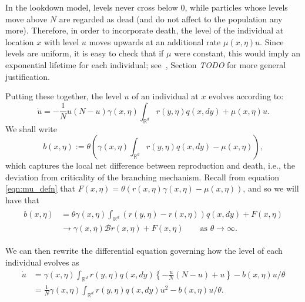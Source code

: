 \documentclass[12pt]{article}
\newcommand{\IR}{\mathbb R}
\newcommand{\DG}{\mathcal{B}}  %
\newcommand{\comment}[1]{{\color{blue} \it #1}}
\begin{document}
In the lookdown model, levels never cross below 0,
while particles whose levels move above $N$ are regarded as dead
(and do not affect to the population any more).
Therefore, in order to incorporate death,
the level of the individual at location $x$ with level $u$
moves upwards at an additional rate $\mu(x,\eta) u$.
Since levels are uniform,
it is easy to check that if $\mu$ were constant,
this would imply an exponential lifetime for each individual;
see~\cite{etheridge/kurtz:2018}, Section \comment{TODO}
for more general justification.

Putting these together,
the level $u$ of an individual at $x$ evolves according to:
\begin{equation} \label{eqn:dot_u}
    \dot u
    =
    - \frac{1}{N} u \left(N - u\right)
    \gamma(x, \eta) \int_{\IR^d} r(y, \eta) q(x, dy) 
    +
    \mu(x,\eta) u .
\end{equation}
We shall write 
$$
    b(x, \eta)
    :=
    \theta\left(
    \gamma(x,\eta) \int_{\IR^d} r(y, \eta) q(x, dy)
    -
    \mu(x,\eta)
    \right) ,
$$
which captures the local net difference between reproduction and death,
i.e., the deviation from criticality of the branching mechanism.
Recall from equation \eqref{eqn:mu_defn} that
$F(x,\eta) = \theta(r(x,\eta)\gamma(x,\eta) - \mu(x,\eta))$,
and so we will have that
\begin{align} \label{eqn:b_limit}
\begin{split}
b(x, \eta)
&=
    \theta \gamma(x, \eta) \int_{\IR^d} \left( r(y, \eta) - r(x, \eta) \right) q(x, dy)
    + F(x, \eta) \\
&\to
    \gamma(x, \eta) \DG r(x, \eta) + F(x, \eta) \qquad \text{as } \theta \to \infty .
\end{split}
\end{align}

We can then rewrite the differential equation 
governing how the level of each individual evolves as
\begin{align}
\dot{u}
    &=
    \gamma(x,\eta) \int_{\IR^d} r(y, \eta) q(x, dy)
    \left\{
        -\frac{u}{N}\left(N - u\right)
        + u
    \right\}
    -
    b(x,\eta) u / \theta
    \nonumber \\
    &=
    \frac{1}{N} \gamma(x,\eta) \int_{\IR^d} r(y, \eta) q(x, dy) u^2
    -
    b(x, \eta) u / \theta
    . \label{differential equation for level}
\end{align}
\end{document}
